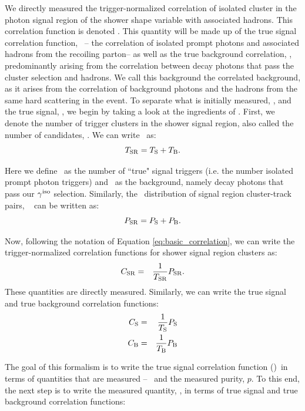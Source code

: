 We directly measured the trigger-normalized correlation of isolated cluster in the photon signal region of the shower shape variable with associated hadrons. This correlation function is denoted \CSR. This quantity will be made up of the true signal correlation function, \CS~-- the correlation of isolated prompt photons and associated hadrons from the recoiling parton-- as well as the true background correlation, \CB, predominantly arising from the correlation between decay photons that pass the cluster selection and hadrons. We call this background the correlated background, as it arises from the correlation of background photons and the hadrons from the same hard scattering in the event. To separate what is initially measured, \CSR, and the true signal, \CS, we begin by taking a look at the ingredients of \CSR. First, we denote the number of trigger clusters in the shower signal region, also called the number of \gammaiso candidates, \TSR. We can write \TSR~as:
\begin{equation}
  \label{eq:TS_TB}
  T_{\mathrm{SR}} = T_{\mathrm{S}} + T_{\mathrm{B}}.
\end{equation}

Here we define \TS~as the number of ``true" signal triggers (i.e. the number isolated prompt photon triggers) and \TB~as the background, namely decay photons that pass our $\gamma^\mathrm{iso}$ selection. Similarly, the \deltaphi~distribution of signal region cluster-track pairs, \PSR~ can be written as:
\begin{equation}
  \label{eq:PS_PB}
  P_{\mathrm{SR}} = P_{\mathrm{S}} + P_{\mathrm{B}}.
\end{equation}

Now, following the notation of Equation \ref{eq:basic_correlation}, we can write the  trigger-normalized correlation functions for shower signal region clusters as:
\begin{eqnarray}
  \label{eq:CSR}
  C_{\mathrm{SR}} &=& \frac{1}{T_{\mathrm{SR}}}P_{\mathrm{SR}}.
\end{eqnarray}
These quantities are directly measured. Similarly, we can write the true signal and true background correlation functions:
\begin{eqnarray}
  C_{\mathrm{S}} &=& \frac{1}{T_{\mathrm{S}}}P_{\mathrm{S}}\\\label{eq:CS}
  C_{\mathrm{B}} &=& \frac{1}{T_{\mathrm{B}}}P_{\mathrm{B}}\label{eq:CB}
\end{eqnarray}

The goal of this formalism is to write the true signal correlation function (\CS)~in terms of quantities that are measured --  \CSR~and the measured purity, $p$. To this end, the next step is to write the measured quantity, \CSR, in terms of true signal and true background correlation functions:

